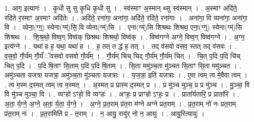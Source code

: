 \documentclass[17pt]{extarticle}
\begin{document}
1. आग॒ इत्यागः॑ । . कृ॒धी सु सु कृ॒धि कृ॒धी सु । . स्व॑स्माꣳ अ॒स्मान् थ्सु स्व॑स्मान् । . अ॒स्माꣳ अदि॑ते॒ रदि॑ते र॒स्माꣳ अ॒स्माꣳ अदि॑तेः । . अदि॑ते॒ रना॑गा॒ अना॑गा॒ अदि॑ते॒ रदि॑ते॒ रना॑गाः । . अना॑गा॒ वि व्यना॑गा॒ अना॑गा॒ वि । . व्येना॒(ग्ग्॒) स्येना(ग्म्॑)सि॒ वि व्येना(ग्म्॑)सि । . एना(ग्म्॑)सि शिश्रथः शिश्रथ॒ एना॒(ग्ग्॒) स्येना(ग्म्॑)सि शिश्रथः । . शि॒श्र॒थो॒ विष्व॒ग् विष्व॑क् छिश्रथः शिश्रथो॒ विष्व॑क् । . विष्व॑गग्ने अग्ने॒ विष्व॒ग् विष्व॑गग्ने । . अ॒ग्न॒ इत्य॑ग्ने । . यथा॑ ह ह॒ यथा॒ यथा॑ ह । . ह॒ तत् त द्ध॑ ह॒ तत् । . तद् व॑सवो वसव॒ स्तत् तद् व॑सवः । . व॒स॒वो॒ गौ॒र्य॑म् गौ॒र्यं॑ ॅवसवो वसवो गौ॒र्य᳚म् । . गौ॒र्य॑म् चिच् चिद् गौ॒र्य॑म् गौ॒र्य॑म् चित् । . चि॒त् प॒दि प॒दि चि॑च् चित् प॒दि । . प॒दि षि॒ताꣳ सि॒ताम् प॒दि प॒दि षि॒ताम् । . सि॒ता ममु॑ञ्च॒ता मु॑ञ्चत सि॒ताꣳ सि॒ता ममु॑ञ्चत । . अमु॑ञ्चता यजत्रा यजत्रा॒ अमु॑ञ्च॒ता मु॑ञ्चता यजत्राः । . य॒ज॒त्रा॒ इति॑ यजत्राः । . ए॒वा त्वम् त्व मे॒वैवा त्वम् । . त्व म॒स्म द॒स्मत् त्वम् त्व म॒स्मत् । . अ॒स्मत् प्र प्रास्म द॒स्मत् प्र । . प्र मु॑ञ्च मुञ्च॒ प्र प्र मु॑ञ्च । . मु॒ञ्चा॒ वि वि मु॑ञ्च मुञ्चा॒ वि । . व्यꣳहो ऽꣳहो॒ वि व्यꣳहः॑ । . अꣳहः॒ प्र प्राꣳहो ऽꣳहः॒ प्र । . प्राता᳚र्यतारि॒ प्र प्राता॑रि । . अ॒ता॒ र्य॒ग्ने॒ अ॒ग्ने॒ अ॒ता॒ र्य॒ता॒ र्य॒ग्ने॒ । . अ॒ग्ने॒ प्र॒त॒राम् प्र॑त॒रा म॑ग्ने अग्ने प्रत॒राम् । . प्र॒त॒राम् नो॑ नः प्रत॒राम् प्र॑त॒राम् नः॑ । . प्र॒त॒रामिति॑ प्र - त॒राम् । . न॒ आयु॒ रायु॑र् नो न॒ आयुः॑ । . आयु॒रित्यायुः॑ । \newline
\end{document}
